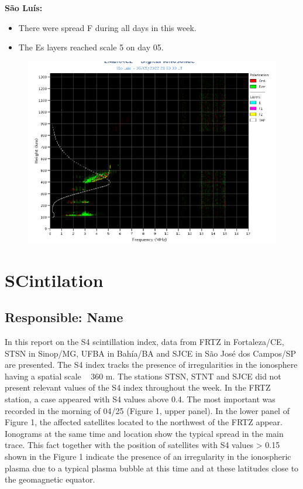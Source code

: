 \documentclass[a4paper, 10pt]{article}
\begin{document}
\textbf{São Luís: }

 \begin{itemize}
\item There were spread F during all days in this week.
\item The Es layers reached scale 5 on day 05. 
\end{itemize}
\begin{figure}[H]
    \centering
    \includegraphics[width=14cm]{./figures//SãoLuís.png}
\end{figure}

\section{SCintilation} 
 \subsection{Responsible: Name} 
 
In this report on the S4 scintillation index, data from FRTZ in Fortaleza/CE, STSN 
in Sinop/MG, UFBA in Bahía/BA and SJCE in São José dos Campos/SP are 
presented. The S4 index tracks the presence of irregularities in the ionosphere 
having a spatial scale ~ 360 m. 
The stations STSN, STNT and SJCE did not present relevant values of the S4 
index throughout the week. In the FRTZ station, a case appeared with S4 values 
above 0.4. The most important was recorded in the morning of 04/25 (Figure 1, 
upper panel). In the lower panel of Figure 1, the affected satellites located to the 
northwest of the FRTZ appear. Ionograms at the same time and location show 
the typical spread in the main trace. This fact together with the position of 
satellites with S4 values > 0.15 shown in the Figure 1 indicate the presence of an 
irregularity in the ionospheric plasma due to a typical plasma bubble at this time 
and at these latitudes close to the geomagnetic equator. 
\end{document}
